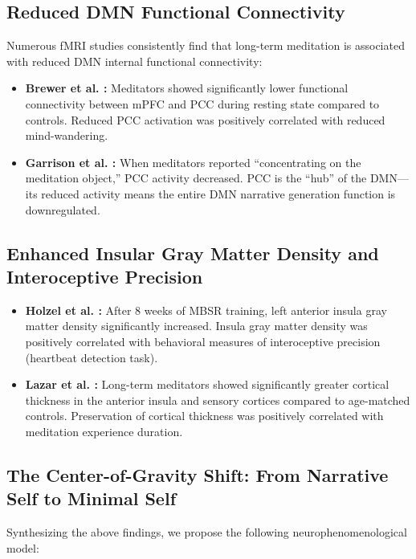 \documentclass[11pt,a4paper]{article}
\begin{document}
\subsection{Reduced DMN Functional Connectivity}

Numerous fMRI studies consistently find that long-term meditation is associated with reduced DMN internal functional connectivity:

\begin{itemize}[nosep]
    \item \textbf{Brewer et al. \cite{Brewer2011}:} Meditators showed significantly lower functional connectivity between mPFC and PCC during resting state compared to controls. Reduced PCC activation was positively correlated with reduced mind-wandering.
    \item \textbf{Garrison et al. \cite{Garrison2015}:} When meditators reported ``concentrating on the meditation object,'' PCC activity decreased. PCC is the ``hub'' of the DMN---its reduced activity means the entire DMN narrative generation function is downregulated.
\end{itemize}

\subsection{Enhanced Insular Gray Matter Density and Interoceptive Precision}

\begin{itemize}[nosep]
    \item \textbf{Holzel et al. \cite{Holzel2008}:} After 8 weeks of MBSR training, left anterior insula gray matter density significantly increased. Insula gray matter density was positively correlated with behavioral measures of interoceptive precision (heartbeat detection task).
    \item \textbf{Lazar et al. \cite{Lazar2005}:} Long-term meditators showed significantly greater cortical thickness in the anterior insula and sensory cortices compared to age-matched controls. Preservation of cortical thickness was positively correlated with meditation experience duration.
\end{itemize}

\subsection{The Center-of-Gravity Shift: From Narrative Self to Minimal Self}

Synthesizing the above findings, we propose the following neurophenomenological model:
\end{document}
